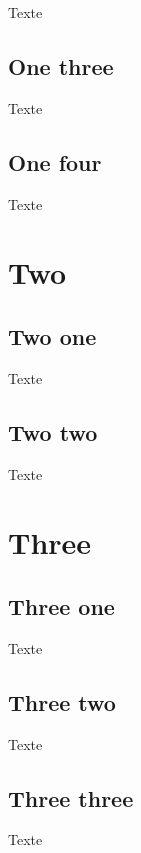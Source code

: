 \documentclass{article}
\begin{document}
Texte

\subsection{One three}

Texte

\subsection{One four}

Texte


\section{Two}

\subsection{Two one}

Texte

\subsection{Two two}

Texte


\section{Three}

\subsection{Three one}

Texte

\subsection{Three two}

Texte

\subsection{Three three}

Texte
\end{document}
